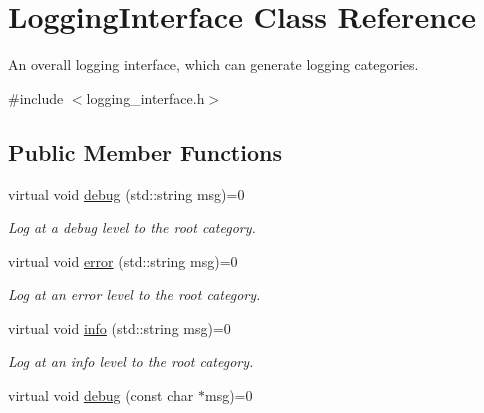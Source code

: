 \hypertarget{classLoggingInterface}{\section{Logging\-Interface Class Reference}
\label{classLoggingInterface}
}


An overall logging interface, which can generate logging categories.  




{\ttfamily \#include $<$logging\-\_\-interface.\-h$>$}

\subsection*{Public Member Functions}
\begin{DoxyCompactItemize}
\item 
\hypertarget{classLoggingInterface_a94e666bf17b42a65c03aff86cbe04978}{virtual void \hyperlink{classLoggingInterface_a94e666bf17b42a65c03aff86cbe04978}{debug} (std\-::string msg)=0}\label{classLoggingInterface_a94e666bf17b42a65c03aff86cbe04978}

\begin{DoxyCompactList}\small\item\em Log at a debug level to the root category. \end{DoxyCompactList}\item 
\hypertarget{classLoggingInterface_a86ba6616c2163d8cb49bed70def8b862}{virtual void \hyperlink{classLoggingInterface_a86ba6616c2163d8cb49bed70def8b862}{error} (std\-::string msg)=0}\label{classLoggingInterface_a86ba6616c2163d8cb49bed70def8b862}

\begin{DoxyCompactList}\small\item\em Log at an error level to the root category. \end{DoxyCompactList}\item 
\hypertarget{classLoggingInterface_a5d994f7cfafe81171954409df64d77ce}{virtual void \hyperlink{classLoggingInterface_a5d994f7cfafe81171954409df64d77ce}{info} (std\-::string msg)=0}\label{classLoggingInterface_a5d994f7cfafe81171954409df64d77ce}

\begin{DoxyCompactList}\small\item\em Log at an info level to the root category. \end{DoxyCompactList}\item 
\hypertarget{classLoggingInterface_a82c2727fb66531d5eec19e39bed79671}{virtual void \hyperlink{classLoggingInterface_a82c2727fb66531d5eec19e39bed79671}{debug} (const char $\ast$msg)=0}\label{classLoggingInterface_a82c2727fb66531d5eec19e39bed79671}


\end{DoxyCompactItemize}
